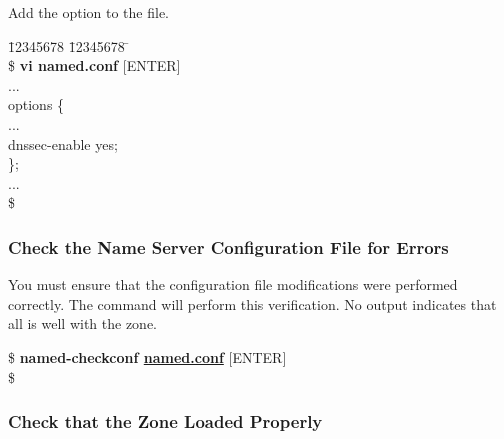 Add the  option to the  file.
\begin{tabbing}
\hspace{0.5in} \= 12345678 \= 12345678 \= \kill \\
\hspace{0.5in}\$ {\bf vi named.conf} $[$ENTER$]$ \\
\hspace{0.5in} ... \\
\hspace{0.5in} options \{ \\
\hspace{0.5in} \> \> ... \\
\hspace{0.5in} \> \> dnssec-enable yes; \\
\hspace{0.5in} \}; \\
\hspace{0.5in} ... \\
\hspace{0.5in}\$ \\
\end{tabbing}


\subsubsection{Check the Name Server Configuration File for Errors}

You must ensure that the configuration file modifications were performed
correctly.  The  command will perform this verification.
No output indicates that all is well with the zone.

\begin{tabbing}
\hspace{0.5in}\$ {\bf named-checkconf \underline{named.conf}} $[$ENTER$]$ \\
\hspace{0.5in}\$ \\
\end{tabbing}





\subsubsection{Check that the Zone Loaded Properly}

